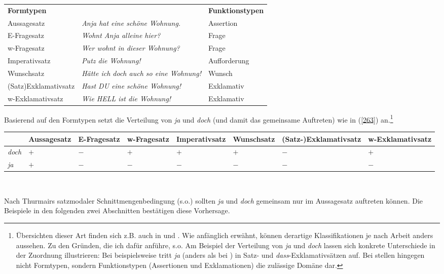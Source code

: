 \begin{exe}
\ex\label{262}
\begin{tabular}[t]{lll}
  	\textbf{Formtypen} & & \textbf{Funktionstypen}\\
  	Aussagesatz & \scriptsize{\textit{Anja hat eine schöne Wohnung.}} & Assertion\\
  	E-Fragesatz & \scriptsize{\textit{Wohnt Anja alleine hier?}} & Frage\\
  	w-Fragesatz & \scriptsize{\textit{Wer wohnt in dieser Wohnung?}} & Frage\\
  	Imperativsatz & \scriptsize{\textit{Putz die Wohnung!}} & Aufforderung\\
  	Wunschsatz & \scriptsize{\textit{Hätte ich doch auch so eine Wohnung!}} & Wunsch\\
  	(Satz)Exklamativsatz & \scriptsize{\textit{Hast DU eine schöne Wohnung!}} & Exklamativ\\
  	w-Exklamativsatz & \scriptsize{\textit{Wie HELL ist die Wohnung!}} & Exklamativ
\end{tabular}
\end{exe}
Basierend auf den Formtypen setzt \citet[49]{Thurmair1989} die Verteilung von \textit{ja} und \textit{doch} (und damit das gemeinsame Auftreten) wie in (\ref{263}) an.\footnote{Übersichten dieser Art finden sich z.B. auch in \citet[59]{Karagjosova2004} und \citet[183]{Kwon2005}. Wie anfänglich erwähnt, können derartige Klassifikationen je nach Arbeit anders aussehen. Zu den Gründen, die ich dafür anführe, s.o. Am Beispiel der Verteilung von \textit{ja} und \textit{doch} lassen sich konkrete Unterschiede in der Zuordnung illustrieren: Bei \citet{Karagjosova2004} beispielsweise tritt \textit{ja} (anders als bei \citealt{Thurmair1989}) in Satz- und \textit{dass}-Exklamativsätzen auf. Bei \citet[157]{Hentschel1986} stellen hingegen nicht Formtypen, sondern Funktionstypen (Assertionen und Exkla\-mationen) die zulässige Domäne dar.}

\begin{exe}
	\ex\label{263}
	\tiny
     \begin{tabular}[t]{|l|l|l|l|l|l|l|l|}
     		\hline
     		& Aussagesatz & E-Fragesatz & w-Fragesatz & Imperativsatz & Wunschsatz & (Satz-)Exklamativsatz & w-Exklamativsatz\\
            \hline
            \textit{doch} & $\plus$ & $\minus$ & $\plus$ & $\plus$ & $\plus$ & $\minus$ & $\plus$\\
             \hline
             \textit{ja} & $\plus$ & $\minus$ & $\minus$ & $\minus$ & $\minus$ & $\minus$ & $\minus$\\
             \hline
      \end{tabular}\\
\end{exe}
Nach Thurmairs satzmodaler Schnittmengenbedingung (s.o.) sollten \textit{ja} und \textit{doch} gemeinsam nur im Aussagesatz auftreten können. Die Beispiele in den folgenden zwei Abschnitten bestätigen diese Vorhersage.

